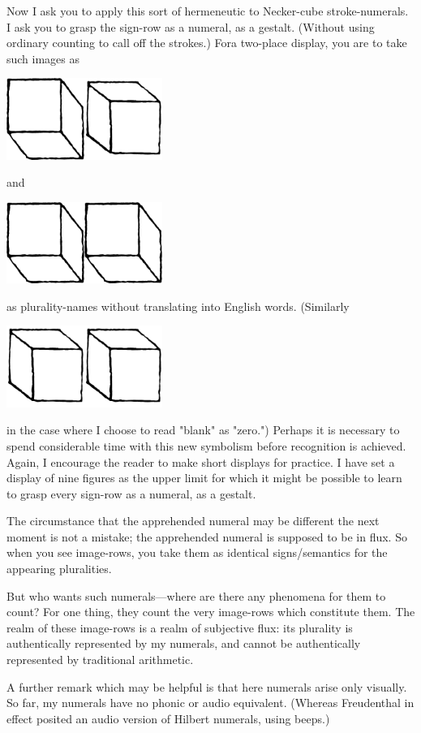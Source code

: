 Now I ask you to apply this sort of hermeneutic to Necker-cube 
stroke-numerals. I ask you to grasp the sign-row as a numeral, as a 
gestalt. (Without using ordinary counting to call off the strokes.) Fora 
two-place display, you are to take such images as 

\newcommand{\neckup}{\includegraphics[width=1in]{img/neckerup}}
\newcommand{\neckdown}{\includegraphics[width=1in]{img/neckerdown}}

{\centering\neckup\neckdown\par}
and
{\centering\neckup\neckup\par}
as plurality-names without translating into English words. (Similarly 

{\centering\neckdown\neckdown\par}

in the case where I choose to read "blank" as "zero.") Perhaps it is 
necessary to spend considerable time with this new symbolism before 
recognition is achieved. Again, I encourage the reader to make short 
displays for practice. I have set a display of nine figures as the upper 
limit for which it might be possible to learn to grasp every sign-row as a 
numeral, as a gestalt. 

The circumstance that the apprehended numeral may be different 
the next moment is not a mistake; the apprehended numeral is supposed 
to be in flux. So when you see image-rows, you take them as 
identical signs/semantics for the appearing pluralities. 

But who wants such numerals---where are there any phenomena 
for them to count? For one thing, they count the very image-rows which 
constitute them. The realm of these image-rows is a realm of subjective 
flux: its plurality is authentically represented by my numerals, and 
cannot be authentically represented by traditional arithmetic. 

A further remark which may be helpful is that here numerals arise 
only visually. So far, my numerals have no phonic or audio equivalent. 
(Whereas Freudenthal in effect posited an audio version of Hilbert 
numerals, using beeps.) 

